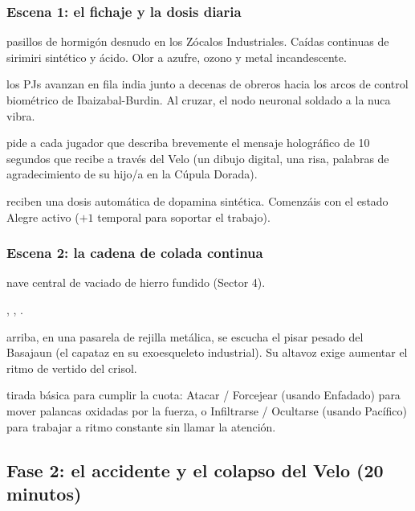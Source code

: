 \subsubsection{Escena 1: el fichaje y la dosis diaria}
 pasillos de hormigón desnudo en los Zócalos Industriales. Caídas continuas de sirimiri sintético y ácido. Olor a azufre, ozono y metal incandescente.\par
{} los PJs avanzan en fila india junto a decenas de obreros hacia los arcos de control biométrico de Ibaizabal-Burdin. Al cruzar, el nodo neuronal soldado a la nuca vibra.\par
{} pide a cada jugador que describa brevemente el mensaje holográfico de 10 segundos que recibe a través del Velo (un dibujo digital, una risa, palabras de agradecimiento de su hijo/a en la Cúpula Dorada).\par
{} reciben una dosis automática de dopamina sintética. Comenzáis con el estado Alegre activo ($+1$ temporal para soportar el trabajo).


\subsubsection{Escena 2: la cadena de colada continua}
 nave central de vaciado de hierro fundido (Sector 4).\par
{} , , .\par
{} arriba, en una pasarela de rejilla metálica, se escucha el pisar pesado del Basajaun (el capataz en su exoesqueleto industrial). Su altavoz exige aumentar el ritmo de vertido del crisol.\par
{} tirada básica para cumplir la cuota: Atacar / Forcejear (usando Enfadado) para mover palancas oxidadas por la fuerza, o Infiltrarse / Ocultarse (usando Pacífico) para trabajar a ritmo constante sin llamar la atención.

\subsection{Fase 2: el accidente y el colapso del Velo (20 minutos)}

